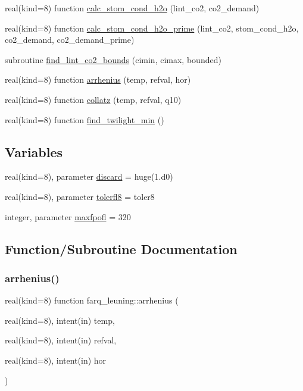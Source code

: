 \begin{DoxyCompactItemize}
\item 
real(kind=8) function \hyperlink{namespacefarq__leuning_ae3bd8aaff5c63ef30cb1004d8a5c9639}{calc\+\_\+stom\+\_\+cond\+\_\+h2o} (lint\+\_\+co2, co2\+\_\+demand)
\item 
real(kind=8) function \hyperlink{namespacefarq__leuning_a90e199343c5428b2b6da2a89795de560}{calc\+\_\+stom\+\_\+cond\+\_\+h2o\+\_\+prime} (lint\+\_\+co2, stom\+\_\+cond\+\_\+h2o, co2\+\_\+demand, co2\+\_\+demand\+\_\+prime)
\item 
subroutine \hyperlink{namespacefarq__leuning_a7f904e78bc57baa0ad78b38d7455e710}{find\+\_\+lint\+\_\+co2\+\_\+bounds} (cimin, cimax, bounded)
\item 
real(kind=8) function \hyperlink{namespacefarq__leuning_a6d031c781aa0a5b3a55dd340813a2c33}{arrhenius} (temp, refval, hor)
\item 
real(kind=8) function \hyperlink{namespacefarq__leuning_ab284bec4bd11bda7c190c6ae2de979fb}{collatz} (temp, refval, q10)
\item 
real(kind=8) function \hyperlink{namespacefarq__leuning_a2a73acc8f131feea39acb9830fadc1cc}{find\+\_\+twilight\+\_\+min} ()
\end{DoxyCompactItemize}
\subsection*{Variables}
\begin{DoxyCompactItemize}
\item 
real(kind=8), parameter \hyperlink{namespacefarq__leuning_a31a2c362c8646a0912470a61a19135b2}{discard} = huge(1.d0)
\item 
real(kind=8), parameter \hyperlink{namespacefarq__leuning_a544a9b3986d12bf60c748eff03f49665}{tolerfl8} = toler8
\item 
integer, parameter \hyperlink{namespacefarq__leuning_ae18ccfcc4ad61a2d80f126c65258fffd}{maxfpofl} = 320
\end{DoxyCompactItemize}


\subsection{Function/\+Subroutine Documentation}
\mbox{\label{namespacefarq__leuning_a6d031c781aa0a5b3a55dd340813a2c33}} 
\subsubsection{\texorpdfstring{arrhenius()}{arrhenius()}}
{\footnotesize\ttfamily real(kind=8) function farq\+\_\+leuning\+::arrhenius (\begin{DoxyParamCaption}\item[{real(kind=8), intent(in)}]{temp,  }\item[{real(kind=8), intent(in)}]{refval,  }\item[{real(kind=8), intent(in)}]{hor }\end{DoxyParamCaption})}

